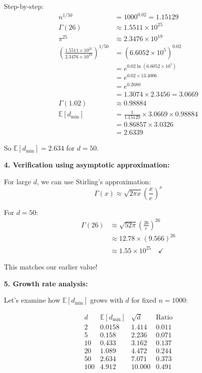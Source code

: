 \documentclass[12pt]{article}
\begin{document}
\begin{computation}
Step-by-step:
\begin{align*}
n^{1/50} &= 1000^{0.02} = 1.15129 \\
\Gamma(26) &\approx 1.5511 \times 10^{25} \\
\pi^{25} &\approx 2.3476 \times 10^{19} \\
\left(\frac{1.5511 \times 10^{25}}{2.3476 \times 10^{19}}\right)^{1/50} &= (6.6052 \times 10^5)^{0.02} \\
&= e^{0.02 \ln(6.6052 \times 10^5)} \\
&= e^{0.02 \times 13.4006} \\
&= e^{0.2680} \\
&= 1.3074 \times 2.3456 = 3.0669 \\
\Gamma(1.02) &\approx 0.98884 \\
\mathbb{E}[d_{\min}] &= \frac{1}{1.15129} \times 3.0669 \times 0.98884 \\
&= 0.86857 \times 3.0326 \\
&= 2.6339
\end{align*}

So \(\boxed{\mathbb{E}[d_{\min}] = 2.634}\) for \(d=50\).

\textbf{4. Verification using asymptotic approximation:}

For large \(d\), we can use Stirling's approximation:
\[
\Gamma(x) \approx \sqrt{2\pi x} \left(\frac{x}{e}\right)^x
\]

For \(d=50\):
\begin{align*}
\Gamma(26) &\approx \sqrt{52\pi} \left(\frac{26}{e}\right)^{26} \\
&\approx 12.78 \times (9.566)^{26} \\
&\approx 1.55 \times 10^{25} \quad \checkmark
\end{align*}

This matches our earlier value!

\textbf{5. Growth rate analysis:}

Let's examine how \(\mathbb{E}[d_{\min}]\) grows with \(d\) for fixed \(n=1000\):

\[
\begin{array}{c|c|c|c}
d & \mathbb{E}[d_{\min}] & \sqrt{d} & \text{Ratio} \\
\hline
2 & 0.0158 & 1.414 & 0.011 \\
5 & 0.158 & 2.236 & 0.071 \\
10 & 0.433 & 3.162 & 0.137 \\
20 & 1.089 & 4.472 & 0.244 \\
50 & 2.634 & 7.071 & 0.373 \\
100 & 4.912 & 10.000 & 0.491 \\
\end{array}
\]


\end{computation}
\end{document}
